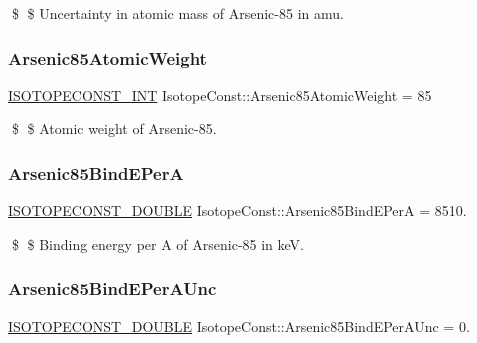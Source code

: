 \$ \$ Uncertainty in atomic mass of Arsenic-\/85 in amu. \mbox{\label{group___isotope_const-_arsenic-_as85_ga73e5cdf1f1b55a7d05e574c6922d224d}} 
\subsubsection{\texorpdfstring{Arsenic85\+Atomic\+Weight}{Arsenic85AtomicWeight}}
{\footnotesize\ttfamily \mbox{\hyperlink{group___isotope_const-_macros_ga5f18360b3e99483a35c32d789e62621c}{I\+S\+O\+T\+O\+P\+E\+C\+O\+N\+S\+T\+\_\+\+I\+NT}} Isotope\+Const\+::\+Arsenic85\+Atomic\+Weight = 85}

\$ \$ Atomic weight of Arsenic-\/85. \mbox{\label{group___isotope_const-_arsenic-_as85_gab3f93f86fb2429561887e42fb7740333}} 
\subsubsection{\texorpdfstring{Arsenic85\+Bind\+E\+PerA}{Arsenic85BindEPerA}}
{\footnotesize\ttfamily \mbox{\hyperlink{group___isotope_const-_macros_ga8f45a7272ce02c0b4c65c44636ed719a}{I\+S\+O\+T\+O\+P\+E\+C\+O\+N\+S\+T\+\_\+\+D\+O\+U\+B\+LE}} Isotope\+Const\+::\+Arsenic85\+Bind\+E\+PerA = 8510.}

\$ \$ Binding energy per A of Arsenic-\/85 in keV. \mbox{\label{group___isotope_const-_arsenic-_as85_ga2802000d5c1053367ffce776bf83dde8}} 
\subsubsection{\texorpdfstring{Arsenic85\+Bind\+E\+Per\+A\+Unc}{Arsenic85BindEPerAUnc}}
{\footnotesize\ttfamily \mbox{\hyperlink{group___isotope_const-_macros_ga8f45a7272ce02c0b4c65c44636ed719a}{I\+S\+O\+T\+O\+P\+E\+C\+O\+N\+S\+T\+\_\+\+D\+O\+U\+B\+LE}} Isotope\+Const\+::\+Arsenic85\+Bind\+E\+Per\+A\+Unc = 0.}

